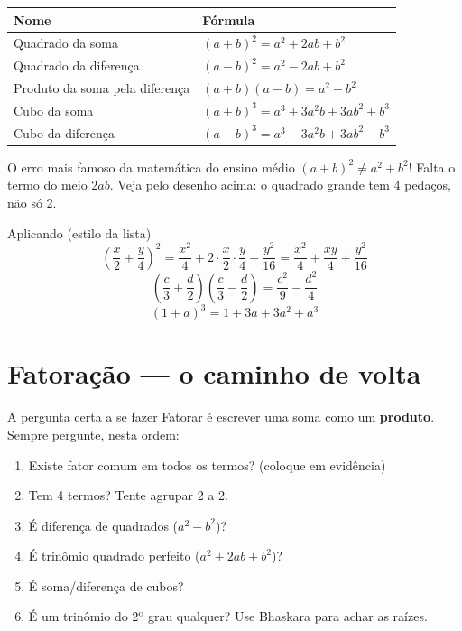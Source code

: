 \documentclass[12pt,a4paper]{article}
\begin{document}
\begin{center}
\renewcommand{\arraystretch}{1.7}
\begin{tabular}{@{}ll@{}}
\toprule
\textbf{Nome} & \textbf{Fórmula}\\
\midrule
Quadrado da soma & $(a+b)^2 = a^2+2ab+b^2$\\
Quadrado da diferença & $(a-b)^2 = a^2-2ab+b^2$\\
Produto da soma pela diferença & $(a+b)(a-b) = a^2-b^2$\\
Cubo da soma & $(a+b)^3 = a^3+3a^2b+3ab^2+b^3$\\
Cubo da diferença & $(a-b)^3 = a^3-3a^2b+3ab^2-b^3$\\
\bottomrule
\end{tabular}
\end{center}

\begin{atencao}{O erro mais famoso da matemática do ensino médio}
$(a+b)^2 \neq a^2+b^2$! Falta o termo do meio $2ab$. Veja pelo desenho
acima: o quadrado grande tem 4 pedaços, não só 2.
\end{atencao}

\begin{exemplo}{Aplicando (estilo da lista)}
\[
\left(\frac{x}{2}+\frac{y}{4}\right)^2 = \frac{x^2}{4} + 2\cdot\frac{x}{2}\cdot\frac{y}{4} + \frac{y^2}{16} = \frac{x^2}{4}+\frac{xy}{4}+\frac{y^2}{16}
\]
\[
\left(\frac{c}{3}+\frac{d}{2}\right)\left(\frac{c}{3}-\frac{d}{2}\right) = \frac{c^2}{9}-\frac{d^2}{4}
\]
\[
(1+a)^3 = 1+3a+3a^2+a^3
\]
\end{exemplo}

\section{Fatoração — o caminho de volta}

\begin{dica}{A pergunta certa a se fazer}
Fatorar é escrever uma soma como um \textbf{produto}. Sempre pergunte, nesta
ordem:
\begin{enumerate}[nosep]
  \item Existe fator comum em todos os termos? (coloque em evidência)
  \item Tem 4 termos? Tente agrupar 2 a 2.
  \item É diferença de quadrados ($a^2-b^2$)?
  \item É trinômio quadrado perfeito ($a^2\pm2ab+b^2$)?
  \item É soma/diferença de cubos?
  \item É um trinômio do 2º grau qualquer? Use Bhaskara para achar as raízes.
\end{enumerate}
\end{dica}
\end{document}

